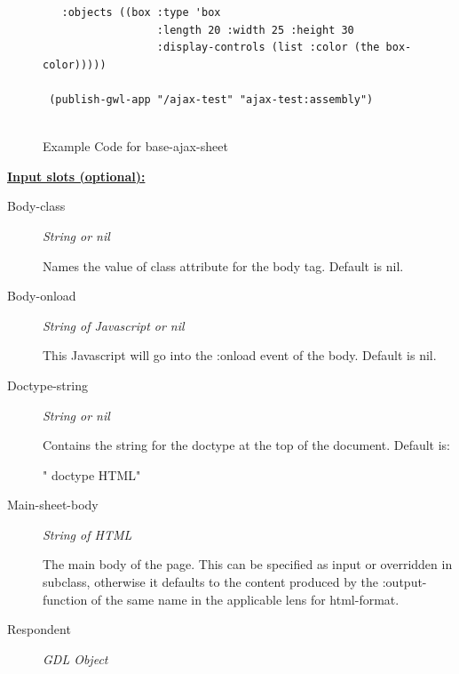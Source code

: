 \documentclass [11pt]{book}
\begin{document}
\begin{itemize}
\begin{figure}
\begin{lrbox}{\boxedverb}
\begin{minipage}{\linewidth}
{\begin{verbatim}
   :objects ((box :type 'box 
                  :length 20 :width 25 :height 30
                  :display-controls (list :color (the box-color)))))
   
 (publish-gwl-app "/ajax-test" "ajax-test:assembly")


\end{verbatim}}
\end{minipage}
\end{lrbox}
\fbox{\usebox{\boxedverb}}

\caption{Example Code for base-ajax-sheet}

\label{fig:example-code-base-ajax-sheet}

\end{figure}





\textbf{
\underline{Input slots (optional):}}

\begin{description}

\item [Body-class]
\emph{String or nil}

 Names the value of class attribute for the body tag. Default is nil.




\item [Body-onload]
\emph{String of Javascript or nil}

 This Javascript will go into the :onload event of the body.
Default is nil.




\item [Doctype-string]
\emph{String or nil}

 Contains the string for the doctype at the top of the document. Default is:

"
\!doctype{ HTML}"




\item [Main-sheet-body]
\emph{String of HTML}

 The main body of the page.
This can be specified as input or overridden in subclass, otherwise it defaults
to the content produced by the :output-function of the same name
in the applicable lens for  html-format.




\item [Respondent]
\emph{GDL Object}


\end{description}
\end{itemize}
\end{document}
